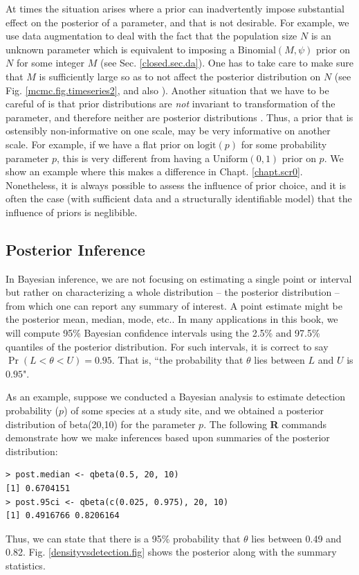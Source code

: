 At times the situation arises where a prior can inadvertently impose
substantial effect on the posterior of a parameter, and that is not desirable.
For example, we use data augmentation
to deal with the fact that the population size $N$ is an unknown parameter
 \citep{royle_etal:2007} which is equivalent to imposing a $\mbox{Binomial}(M,\psi)$
 prior on $N$ for some integer $M$ (see Sec. \ref{closed.sec.da}). One has to take care to make sure
 that $M$ is sufficiently large so as to not affect the posterior
 distribution on $N$ (see Fig. \ref{mcmc.fig.timeseries2}, and also
 \citet[][Ch. 5]{kery_schaub:2011}).
Another situation that we have
 to be careful of is that
prior 
distributions are {\it not} invariant to transformation of the
parameter,
and therefore neither are posterior distributions
\citep[][Sec. 6.2.1]{link_barker:2010}. Thus, a prior that is ostensibly
non-informative on one scale, may be very informative on another
scale. 
For example, if we have a flat prior on $\mbox{logit}(p)$ for some probability
parameter $p$, this is very different from having a 
$\mbox{Uniform}(0,1)$ prior 
on $p$. We show an example where this makes a difference in
Chapt. \ref{chapt.scr0}. Nonetheless, it is always possible to assess
the influence of prior choice, and it is often the case (with
sufficient data and a structurally identifiable model) that the
influence of priors is neglibible. 

\subsection{Posterior Inference}

In Bayesian inference, we are not focusing on estimating a single
point or interval but rather on characterizing a whole distribution --
the posterior distribution -- from which one can report any summary of
interest. A point estimate might be the posterior mean, median, mode,
etc..  In many applications in this book, we will compute 95\%
Bayesian confidence intervals using the 2.5\% and 97.5\% quantiles of the
posterior distribution. For such intervals, it is correct to say
$\Pr(L < \theta < U) = 0.95$. That is, ``the probability that $\theta$
lies between $L$ and $U$ is $0.95$". 

As an
example, suppose we conducted a Bayesian analysis to estimate
detection probability ($p$) of some species at a study site, and we
obtained a posterior distribution of beta(20,10) for the parameter
$p$. The following {\bf R} commands demonstrate how we make inferences based
upon summaries of the posterior distribution:
\begin{verbatim}
> post.median <- qbeta(0.5, 20, 10)
[1] 0.6704151
> post.95ci <- qbeta(c(0.025, 0.975), 20, 10)
[1] 0.4916766 0.8206164
\end{verbatim}
Thus, we can state that there is a 95\% probability that $\theta$ lies
between 0.49 and 0.82. Fig. \ref{densityvsdetection.fig} shows the
posterior along with the summary statistics.

